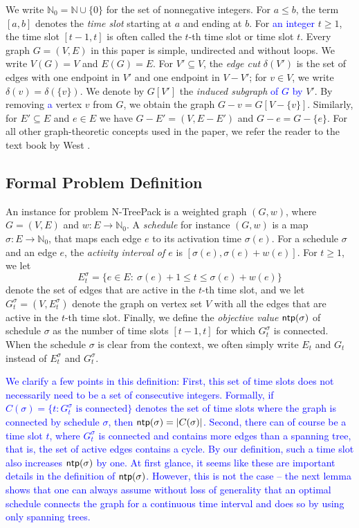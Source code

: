 \documentclass[runningheads]{llncs}
\newcommand{\NN}{\mathbb{N}}
\newcommand{\set}[1]{\{ #1 \}}
\newcommand{\xxxNTP}{{\sc N-TreePack}}
\DeclareMathOperator{\ntp}{\text{\sf ntp}}
\newcommand{\lasse}[1]{\textcolor{blue}{#1}}
\begin{document}
We write $\NN_0= \NN \cup \set{0}$ for the set of nonnegative integers. 
For $a\le b$, the term $[a,b]$ denotes the \emph{time slot} starting at $a$ and ending at $b$. 
For \lasse{an integer} $t\ge1$, the time slot $[t-1,t]$ is often called the $t$-th time slot or time slot $t$.
Every graph $G=(V,E)$ in this paper is simple, undirected and without loops. We write $V(G) = V$ and $E(G) = E$.
For $V'\subseteq V$, the \emph{edge cut} $\delta(V')$ is the set of edges with one endpoint 
in $V'$ and one endpoint in $V-V'$; for $v\in V$, we write $\delta(v) = \delta(\set{v})$.
We denote by $G[V']$ the \emph{induced subgraph} \lasse{of $G$ by} $V'$.
By removing \lasse{a} vertex $v$ from $G$, we obtain the graph $G-v=G[V-\set{v}]$.
Similarly, for $E'\subseteq E$ and $e\in E$ we have $G-E'=(V,E-E')$ and $G-e=G-\set{e}$. For all other graph-theoretic concepts used in the paper, we refer the reader to the
text book by West \cite{WestBook}.

\subsection{Formal Problem Definition}

An instance for problem {\xxxNTP} is a weighted graph $(G,w)$, where $G=(V,E)$ and $w:E\to\NN_0$. 
A \emph{schedule} for instance $(G,w)$ is a map $\sigma:E\to\NN_0$, that maps each edge $e$ to 
its activation time $\sigma(e)$.
For a schedule $\sigma$ and an edge $e$, the \emph{activity interval of $e$} is $[\sigma(e),\sigma(e)+w(e)]$. 
For $t\ge1$, we let 
\[E^\sigma_t= \set{e\in E:~ \sigma(e)+1 \le t \le \sigma(e)+w(e)}\]
 denote 
the set of edges that are active in the $t$-th time slot, and we let $G^\sigma_t=(V,E^\sigma_t)$ 
denote the graph on vertex set $V$ with all the edges that are active in the $t$-th time slot. 
Finally, we define the \emph{objective value} $\ntp(\sigma)$ of schedule $\sigma$ as the number of time 
slots $[t-1,t]$ for which $G^\sigma_t$ is connected. When the schedule $\sigma$ is clear from the context, we often simply write $E_t$ and $G_t$ instead of 
$E^\sigma_t$ and $G^\sigma_t$. 

 \lasse{We clarify a few points in this definition: 
First, this set of time slots does not necessarily need to be a set of consecutive integers. Formally, if $C(\sigma) = \set{t : G^\sigma_t \text{ is connected}}$ denotes the set of time slots where the graph is connected by schedule $\sigma$, then $\ntp(\sigma) = |C(\sigma)|$. 
Second, there can of course be a time slot $t$, where $G^\sigma_t$ is connected and contains more edges than a spanning tree, that is, the set of active edges contains a cycle. 
By our definition, such a time slot also increases $\ntp(\sigma)$ by one. 
At first glance, it seems like these are important details in the definition of $\ntp(\sigma)$. 
However, this is not the case -- the next lemma shows that one can always assume without loss of generality that an optimal schedule connects the graph for a continuous time interval and does so by using only spanning trees. }
\end{document}
